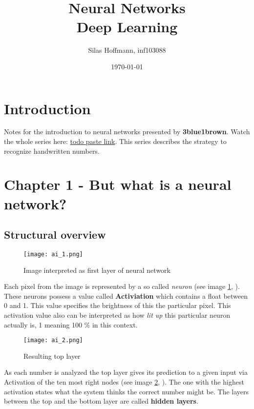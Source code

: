 \documentclass{article}
\title{%
Neural Networks \\
\large Deep Learning}
\author{Silas Hoffmann, inf103088}
\date{\today}
\newcommand{\lbl}[1]{(see image \ref{#1}, \textit{\nameref{#1}})}
\begin{document}
\maketitle

\vspace{0.5cm}
\tableofcontents
\vspace{0.5cm}

\section{Introduction}
Notes for the introduction to neural networks presented by \textbf{3blue1brown}. Watch the whole series here: \underline{todo paste link}. This series describes the strategy to recognize handwritten numbers.

\clearpage

\section{Chapter 1 - But what is a neural network?}


\subsection{Structural overview}

\FloatBarrier

\begin{figure}[h]
\centering
\texttt{[image: ai\_1.png]}
\caption{Image interpreted as first layer of neural network}
\label{ai_1}
\end{figure}

Each pixel from the image is represented by a so called \textit{neuron} \lbl{ai_1}. These neurons possess a value called \textbf{Activiation} which contains a float between 0 and 1. This value specifies the brightness of this the particular pixel. This activation value also can be interpreted as how \textit{lit up} this particular neuron actually is, 1 meaning 100 \% in this context.


\begin{figure}[b!]
\centering
\texttt{[image: ai\_2.png]}
\caption{Resulting top layer}
\label{ai_2}
\end{figure}

As each number is analyzed the top layer gives its prediction to a given input via Activation of the ten most right nodes \lbl{ai_2}. The one with the highest activation states what the system thinks the correct number might be. The layers between the top and the bottom layer are called \textbf{hidden layers}. 
\end{document}
